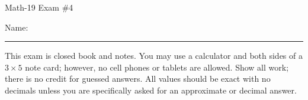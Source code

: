 \documentclass[letterpaper,12pt,fleqn]{article}
\begin{document}
\begin{center}
\Large Math-19 Exam \#4
\end{center}

\vspace{0.5in}

Name: \rule{4in}{1pt}

\vspace{1in}

This exam is closed book and notes. You may use a calculator and both sides of
a $3\times 5$ note card; however, no cell phones or tablets are allowed. Show
all work; there is no credit for guessed answers. All values should be exact
with no decimals unless you are specifically asked for an approximate or
decimal answer.

\vspace{0.5in}

\begin{center}
\end{center}

\newpage
\end{document}
